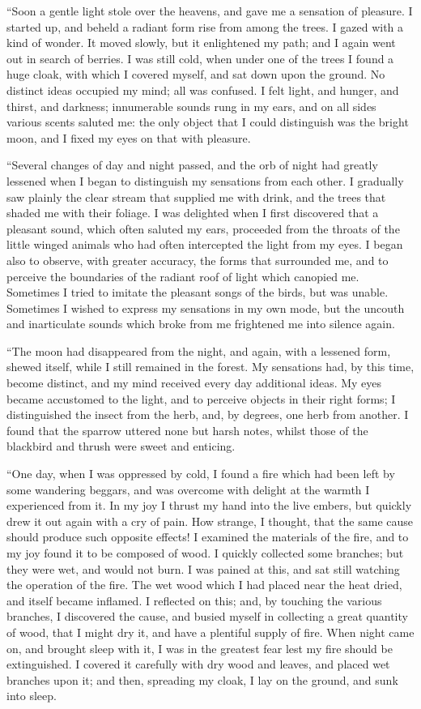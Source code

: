 ``Soon a gentle light stole over the
heavens, and gave me a sensation of
pleasure. I started up, and beheld a
radiant form rise from among the trees.
I gazed with a kind of wonder. It
moved slowly, but it enlightened my
path; and I again went out in search of
berries. I was still cold, when under
one of the trees I found a huge cloak,
with which I covered myself, and sat
down upon the ground. No distinct
ideas occupied my mind; all was confused.
I felt light, and hunger, and
thirst, and darkness; innumerable
sounds rung in my ears, and on all
sides various scents saluted me: the
only object that I could distinguish was
the bright moon, and I fixed my eyes
on that with pleasure.

``Several changes of day and night
passed, and the orb of night had greatly
lessened when I began to distinguish
my sensations from each other. I gradually
saw plainly the clear stream
that supplied me with drink, and the
trees that shaded me with their foliage.
I was delighted when I first discovered
that a pleasant sound, which often
saluted my ears, proceeded from the
throats of the little winged animals who
had often intercepted the light from
my eyes. I began also to observe, with
greater accuracy, the forms that surrounded
me, and to perceive the boundaries
of the radiant roof of light which
canopied me. Sometimes I tried to imitate
the pleasant songs of the birds, but
was unable. Sometimes I wished to
express my sensations in my own mode,
but the uncouth and inarticulate sounds
which broke from me frightened me
into silence again.

``The moon had disappeared from
the night, and again, with a lessened
form, shewed itself, while I still remained
in the forest. My sensations
had, by this time, become distinct, and
my mind received every day additional
ideas. My eyes became accustomed
to the light, and to perceive objects
in their right forms; I distinguished
the insect from the herb, and, by degrees,
one herb from another. I found
that the sparrow uttered none but
harsh notes, whilst those of the blackbird
and thrush were sweet and enticing.

``One day, when I was oppressed by
cold, I found a fire which had been left
by some wandering beggars, and was
overcome with delight at the warmth I
experienced from it. In my joy I thrust
my hand into the live embers, but
quickly drew it out again with a cry of
pain. How strange, I thought, that the
same cause should produce such opposite
effects! I examined the materials
of the fire, and to my joy found it to be
composed of wood. I quickly collected
some branches; but they were wet, and
would not burn. I was pained at this,
and sat still watching the operation of
the fire. The wet wood which I had
placed near the heat dried, and itself
became inflamed. I reflected on this;
and, by touching the various branches,
I discovered the cause, and busied myself
in collecting a great quantity of
wood, that I might dry it, and have a
plentiful supply of fire. When night
came on, and brought sleep with it, I
was in the greatest fear lest my fire
should be extinguished. I covered it
carefully with dry wood and leaves,
and placed wet branches upon it; and
then, spreading my cloak, I lay on the
ground, and sunk into sleep.

